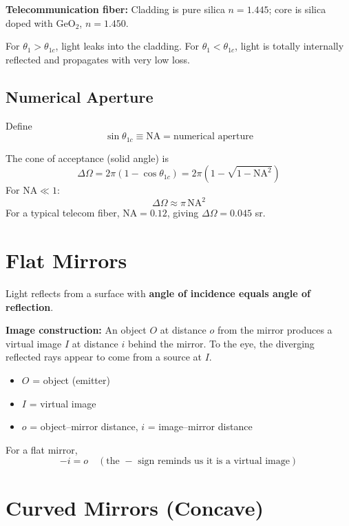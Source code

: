 \documentclass[11pt]{report}
\begin{document}
\textbf{Telecommunication fiber:} Cladding is pure silica $n = 1.445$; core is silica doped with GeO$_2$, $n = 1.450$.

For $\theta_1 > \theta_{1c}$, light leaks into the cladding. For $\theta_1 < \theta_{1c}$, light is totally internally reflected and propagates with very low loss.

\subsection*{Numerical Aperture}

Define
\begin{equation}
\sin\theta_{1c} \equiv \mathrm{NA} = \text{numerical aperture}
\end{equation}

The cone of acceptance (solid angle) is
\begin{equation}
\Delta\Omega = 2\pi(1 - \cos\theta_{1c}) = 2\pi\left(1 - \sqrt{1 - \mathrm{NA}^2}\right)
\end{equation}
For $\mathrm{NA} \ll 1$:
\begin{equation}
\Delta\Omega \approx \pi\,\mathrm{NA}^2
\end{equation}
For a typical telecom fiber, $\mathrm{NA} = 0.12$, giving $\Delta\Omega = 0.045$ sr.

\section{Flat Mirrors}

Light reflects from a surface with \textbf{angle of incidence equals angle of reflection}.

\textbf{Image construction:} An object $O$ at distance $o$ from the mirror produces a virtual image $I$ at distance $i$ behind the mirror. To the eye, the diverging reflected rays appear to come from a source at $I$.
\begin{itemize}
    \item $O$ = object (emitter)
    \item $I$ = virtual image
    \item $o$ = object--mirror distance, $i$ = image--mirror distance
\end{itemize}
For a flat mirror,
\begin{equation}
\boxed{-i = o \quad (\text{the } - \text{ sign reminds us it is a virtual image})}
\end{equation}

\section{Curved Mirrors (Concave)}
\end{document}
